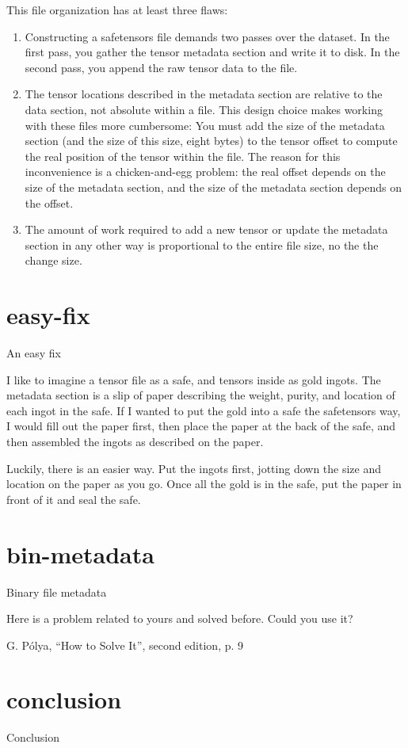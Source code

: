 \documentclass{article}
\begin{document}
This file organization has at least three flaws:
\begin{enumerate}
\item 
  Constructing a safetensors file demands two passes over the dataset.
  In the first pass, you gather the tensor metadata section and write it to disk.
  In the second pass, you append the raw tensor data to the file.
\item
  The tensor locations described in the metadata section are relative to the data section, not absolute within a file.
  This design choice makes working with these files more cumbersome:
  You must add the size of the metadata section (and the size of this size, eight bytes) to the tensor offset to compute the real position of the tensor within the file.
  The reason for this inconvenience is a chicken-and-egg problem:
  the real offset depends on the size of the metadata section,
  and the size of the metadata section depends on the offset.
\item
  The amount of work required to add a new tensor or update the metadata section in any other way is proportional to the entire file size,
  no the the change size.
\end{enumerate}

\section{easy-fix}{An easy fix}

I like to imagine a tensor file as a safe, and tensors inside as gold ingots.
The metadata section is a slip of paper describing the weight, purity, and location of each ingot in the safe.
If I wanted to put the gold into a safe the safetensors way,
I would fill out the paper first,
then place the paper at the back of the safe,
and then assembled the ingots as described on the paper.

Luckily, there is an easier way.
Put the ingots first, jotting down the size and location on the paper as you go.
Once all the gold is in the safe, put the paper in front of it and seal the safe.

\section{bin-metadata}{Binary file metadata}

\epigraph{
  Here is a problem related to yours and solved before.
  Could you use it?
}{G. Pólya, ``How to Solve It'', second edition, p. 9}

\section{conclusion}{Conclusion}
\end{document}

